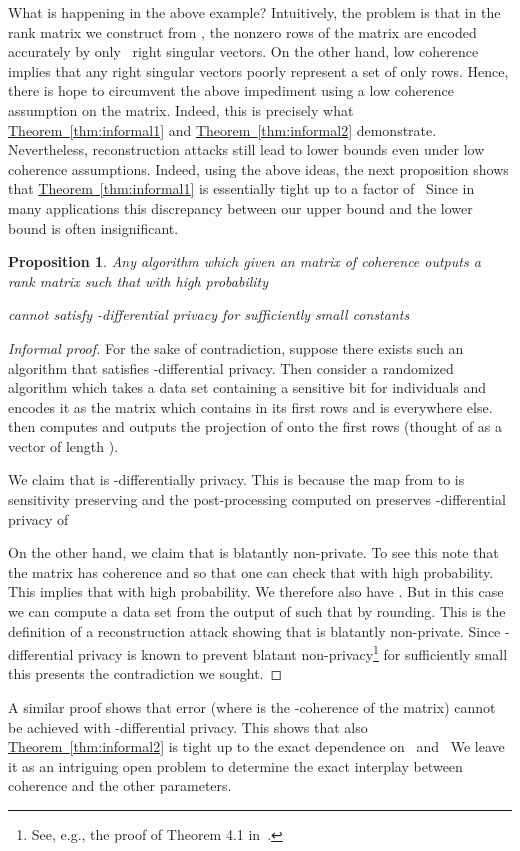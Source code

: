 \documentclass[letterpaper,11pt]{article}
\newtheorem{proposition}[theorem]{Proposition}
\theoremstyle{definition}
\newcommand{\theoremref}[1]{\hyperref[thm:#1]{Theorem~\ref{thm:#1}}}
\begin{document}
What is happening in the above example? Intuitively, the problem is that in
the rank  matrix we construct from , the  nonzero rows of the matrix
are encoded accurately by only ~right singular vectors. On the other hand, low
coherence implies that any  right singular vectors poorly represent a set
of only  rows. Hence, there is hope to circumvent the above impediment using a
low coherence assumption on the matrix. Indeed, this is precisely what
\theoremref{informal1} and \theoremref{informal2} demonstrate.
Nevertheless, reconstruction attacks still lead to lower bounds even under low
coherence assumptions. Indeed, using the above ideas, the next proposition shows
that \theoremref{informal1} is essentially tight up to a factor
of~ Since in many applications  this discrepancy
between our upper bound and the lower bound is often insignificant.
\begin{proposition}
Any algorithm which given an  matrix  of coherence  outputs a
rank  matrix  such that with high probability

cannot satisfy -differential privacy for
sufficiently small constants 
\end{proposition}
\begin{proof}[Informal proof]
For the sake of contradiction, suppose there exists such an algorithm 
that satisfies -differential privacy. Then consider a
randomized algorithm  which takes a data set
 containing a sensitive bit for  individuals and
encodes it as the  matrix  which contains  in its first 
rows and is  everywhere else.  then computes  and
outputs the projection of  onto the first  rows (thought of as a
vector of length ).

We claim that  is
-differentially privacy. This is because the map from 
to  is sensitivity preserving and the post-processing computed on 
preserves -differential privacy of 

On the other hand, we claim that  is blatantly non-private. To see this
note that the matrix  has coherence  and 
so that one can check that  with high probability.
This implies that  with high probability. We therefore also have . But in
this case we can compute a data set  from the output of  such that
 by rounding. This is the definition of a reconstruction attack showing
that  is blatantly non-private. Since -differential
privacy is known to prevent blatant non-privacy\footnote{See, e.g., the proof
of Theorem 4.1 in~\cite{De11}.} for sufficiently small
 this presents the contradiction we sought.
\end{proof}
A similar proof shows that error  (where 
is the -coherence of the matrix) cannot be achieved with
-differential privacy. This shows that also
\theoremref{informal2} is tight up to the exact dependence on~ and~ We
leave it as an intriguing open problem to determine the exact interplay
between coherence and the other parameters.
\end{document}
